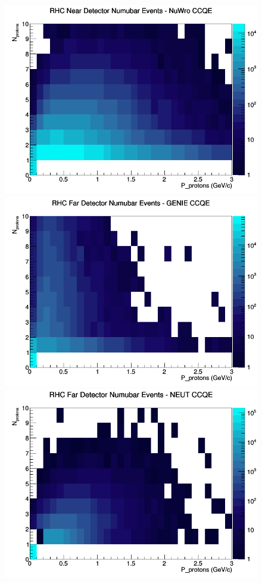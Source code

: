 \begin{figure}[h]
\includegraphics[width=\linewidth]{N_P/nominal/protons/CCQE_RHC_ND_numubar_N_P_NuWro.png}
\endminipage
\newline
{}
\includegraphics[width=\linewidth]{N_P/nominal/protons/CCQE_RHC_FD_numubar_N_P_GENIE.png}
\endminipage
{}
\includegraphics[width=\linewidth]{N_P/nominal/protons/CCQE_RHC_FD_numubar_N_P_NEUT.png}

\end{figure}
